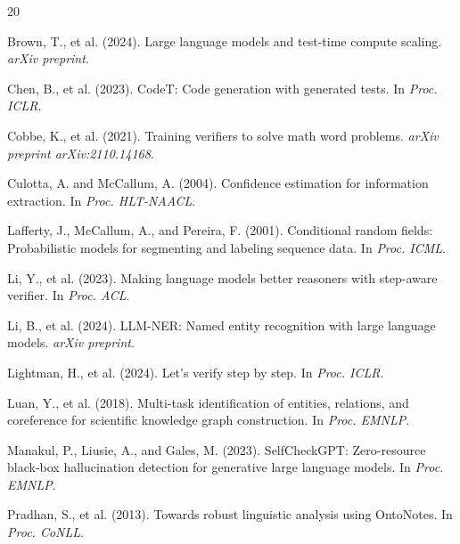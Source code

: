 \documentclass[11pt]{article}
\begin{document}
\begin{thebibliography}{20}

Brown, T., et al. (2024).
\newblock Large language models and test-time compute scaling.
\newblock \emph{arXiv preprint}.

Chen, B., et al. (2023).
\newblock CodeT: Code generation with generated tests.
\newblock In \emph{Proc. ICLR}.

Cobbe, K., et al. (2021).
\newblock Training verifiers to solve math word problems.
\newblock \emph{arXiv preprint arXiv:2110.14168}.

Culotta, A. and McCallum, A. (2004).
\newblock Confidence estimation for information extraction.
\newblock In \emph{Proc. HLT-NAACL}.

Lafferty, J., McCallum, A., and Pereira, F. (2001).
\newblock Conditional random fields: Probabilistic models for segmenting and labeling sequence data.
\newblock In \emph{Proc. ICML}.

Li, Y., et al. (2023).
\newblock Making language models better reasoners with step-aware verifier.
\newblock In \emph{Proc. ACL}.

Li, B., et al. (2024).
\newblock LLM-NER: Named entity recognition with large language models.
\newblock \emph{arXiv preprint}.

Lightman, H., et al. (2024).
\newblock Let's verify step by step.
\newblock In \emph{Proc. ICLR}.

Luan, Y., et al. (2018).
\newblock Multi-task identification of entities, relations, and coreference for scientific knowledge graph construction.
\newblock In \emph{Proc. EMNLP}.

Manakul, P., Liusie, A., and Gales, M. (2023).
\newblock SelfCheckGPT: Zero-resource black-box hallucination detection for generative large language models.
\newblock In \emph{Proc. EMNLP}.

Pradhan, S., et al. (2013).
\newblock Towards robust linguistic analysis using OntoNotes.
\newblock In \emph{Proc. CoNLL}.


\end{thebibliography}
\end{document}
